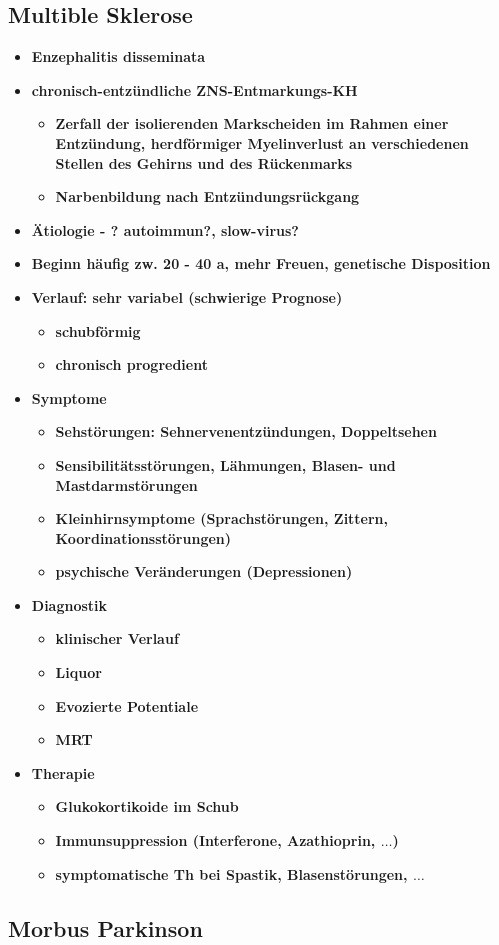 	\subsection{Multible Sklerose}
		\begin{itemize}
			\item \textbf{Enzephalitis disseminata}
			\item \textbf{chronisch-entzündliche ZNS-Entmarkungs-KH}
				\begin{itemize}
					\item \textbf{Zerfall der isolierenden Markscheiden im Rahmen einer Entzündung, herdförmiger Myelinverlust an verschiedenen Stellen des Gehirns und des Rückenmarks}
					\item \textbf{Narbenbildung nach Entzündungsrückgang}
				\end{itemize}
			\item \textbf{Ätiologie - ? autoimmun?, slow-virus?}
			\item \textbf{Beginn häufig zw. 20 - 40 a, mehr Freuen, genetische Disposition}
			\item \textbf{Verlauf: sehr variabel (schwierige Prognose)}
				\begin{itemize}
					\item \textbf{schubförmig}
					\item \textbf{chronisch progredient}
				\end{itemize}
			\item \textbf{Symptome}
				\begin{itemize}
					\item \textbf{Sehstörungen: Sehnervenentzündungen, Doppeltsehen}
					\item \textbf{Sensibilitätsstörungen, Lähmungen, Blasen- und Mastdarmstörungen}
					\item \textbf{Kleinhirnsymptome (Sprachstörungen, Zittern, Koordinationsstörungen)}
					\item \textbf{psychische Veränderungen (Depressionen)}
				\end{itemize}
			\item \textbf{Diagnostik}
				\begin{itemize}
					\item \textbf{klinischer Verlauf}
					\item \textbf{Liquor}
					\item \textbf{Evozierte Potentiale}
					\item \textbf{MRT}
				\end{itemize}
			\item \textbf{Therapie}
				\begin{itemize}
					\item \textbf{Glukokortikoide im Schub}
					\item \textbf{Immunsuppression (Interferone, Azathioprin, $\dots$)}
					\item \textbf{symptomatische Th bei Spastik, Blasenstörungen, $\dots$}
				\end{itemize}
		\end{itemize}
	\subsection{Morbus Parkinson}